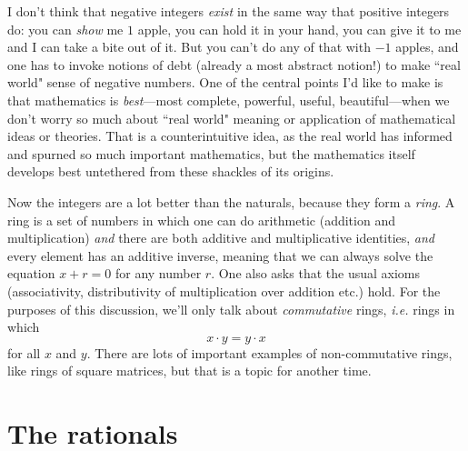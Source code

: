 \documentclass[11pt,oneside]{amsart}
\begin{document}
I don't think that negative integers {\em exist} in the same way that positive integers do: you can {\em show} me $1$ apple, you can hold it in your hand,
you can give it to me and I can take a bite out of it.  But you can't do any of that with $-1$ apples, and one has to invoke notions of debt (already a most abstract notion!) to make ``real world" sense of negative numbers. One of the central points I'd like to make is that mathematics is {\em best}---most complete, powerful, useful, beautiful---when we don't worry so much about ``real world" meaning or application of mathematical ideas or theories.  That is a counterintuitive idea, 
as the real world has informed and spurned so much important mathematics, but the mathematics itself develops best untethered from these shackles of its origins.

Now the integers are a lot better than the naturals, because they form a {\em ring}.  A ring is a set of numbers in which one can do arithmetic
(addition and multiplication) {\em and} there are both additive and multiplicative identities, {\em and} every element has an additive inverse,
meaning that we can always solve the equation $x+r = 0$ for any number $r$.  One also asks that the usual axioms (associativity, distributivity of
multiplication over addition etc.) hold.  
For the purposes of this discussion, we'll only talk about {\em commutative} rings, 
{\em i.e.} rings in which
$$x\cdot y = y\cdot x$$
for all $x$ and $y$.  There are lots of important examples of non-commutative rings, like rings of square matrices, but that is a topic for another time.


\section{The rationals}
\end{document}
